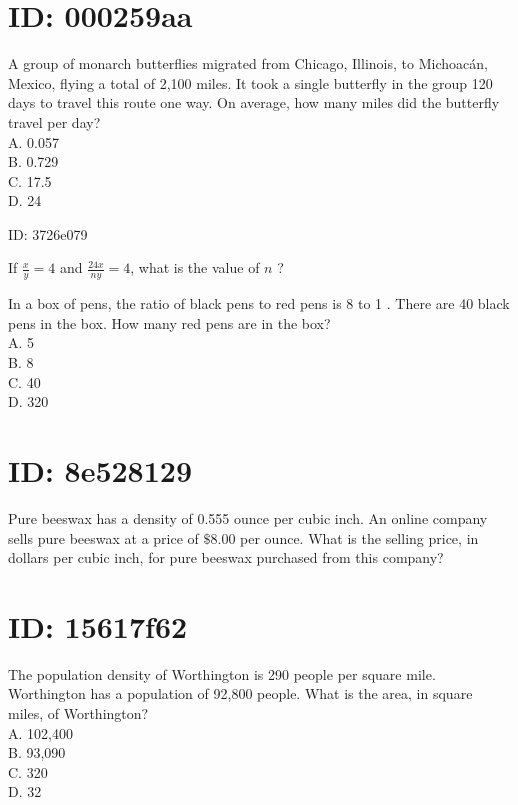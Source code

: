 \section*{ID: 000259aa}
A group of monarch butterflies migrated from Chicago, Illinois, to Michoacán, Mexico, flying a total of 2,100 miles. It took a single butterfly in the group 120 days to travel this route one way. On average, how many miles did the butterfly travel per day?\\
A. 0.057\\
B. 0.729\\
C. 17.5\\
D. 24

ID: 3726e079

If $\frac{x}{y}=4$ and $\frac{24 x}{n y}=4$, what is the value of $n$ ?

In a box of pens, the ratio of black pens to red pens is 8 to 1 . There are 40 black pens in the box. How many red pens are in the box?\\
A. 5\\
B. 8\\
C. 40\\
D. 320

\section*{ID: 8e528129}
Pure beeswax has a density of 0.555 ounce per cubic inch. An online company sells pure beeswax at a price of $\$ 8.00$ per ounce. What is the selling price, in dollars per cubic inch, for pure beeswax purchased from this company?

\section*{ID: 15617f62}
The population density of Worthington is 290 people per square mile. Worthington has a population of 92,800 people. What is the area, in square miles, of Worthington?\\
A. 102,400\\
B. 93,090\\
C. 320\\
D. 32























































